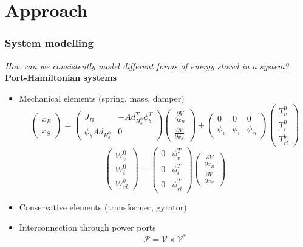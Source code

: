 \documentclass[student]{ITRslides}
\begin{document}
\section{Approach}
\begin{frame}
	\frametitle{System modelling}
	\textit{How can we consistently model different forms of energy stored in a system?\\}
	\textbf{Port-Hamiltonian systems\\}
	\begin{itemize}
	
		\item Mechanical elements (spring, mass, damper)
		\[\begin{pmatrix}\dot{x}_B \\ \dot{x}_S\end{pmatrix} = 
		\begin{pmatrix}J_B & -Ad_{H_b^0}^T \phi_b^T \\ \phi_b Ad_{H_b^0} & 0\end{pmatrix}
		\begin{pmatrix}\frac{\partial V}{\partial x_B} \\ \frac{\partial V}{\partial x_S}\end{pmatrix} + \begin{pmatrix}0 & 0 & 0 \\ \phi_v & \phi_i & \phi_{rl}\end{pmatrix}	
		\begin{pmatrix}T_v^0 \\ T_i^0 \\ T_{rl}^b\end{pmatrix}			 \]
		\[\begin{pmatrix}W_v^0 \\ W_i^0 \\ W_{rl}^b\end{pmatrix}=
		\begin{pmatrix}0 & \phi_v^T\\0 & \phi_i^T\\0 & \phi_{rl}^T	
		\end{pmatrix}
		\begin{pmatrix}\frac{\partial V}{\partial x_B} \\ \frac{\partial V}{\partial x_S}\end{pmatrix}\]
		\item Conservative elements (transformer, gyrator)
			\item Interconnection through power ports
		\[ \mathcal{P} = \mathcal{V} \times \mathcal{V}^* \]

\end{itemize}
\end{frame}
\end{document}
